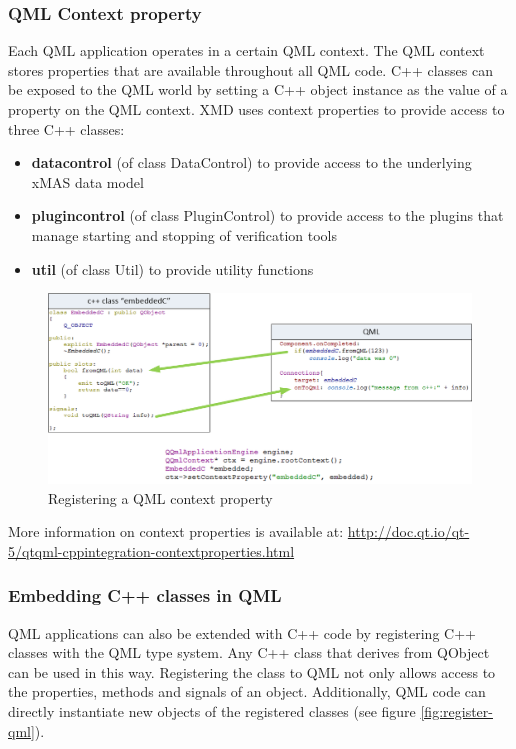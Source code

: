 \subsubsection{QML Context property}
Each QML application operates in a certain QML context. The QML context stores
properties that are available throughout all QML code. C++ classes can be exposed
to the QML world by setting a C++ object instance as the value of a property
on the QML context.
XMD uses context properties to provide access to three C++ classes:

\begin{itemize}
 \item \textbf{datacontrol} (of class DataControl) to provide access to the
 underlying xMAS data model
 \item \textbf{plugincontrol} (of class PluginControl) to provide access to
 the plugins that manage starting and stopping of verification tools
 \item \textbf{util} (of class Util) to provide utility functions
\end{itemize}

\begin{figure}
    \includegraphics[width=\textwidth]{qml3}
    \caption{Registering a QML context property}
\end{figure}


More information on context properties is available at:
\url{http://doc.qt.io/qt-5/qtqml-cppintegration-contextproperties.html}


\subsubsection{Embedding C++ classes in QML}

QML applications can also be extended with C++ code by registering C++ classes
with the QML type system. Any C++ class that derives from QObject can be used
in this way. Registering the class to QML not only allows access to the properties,
methods and signals of an object. Additionally, QML code can directly instantiate
new objects of the registered classes (see figure \ref{fig:register-qml}).

